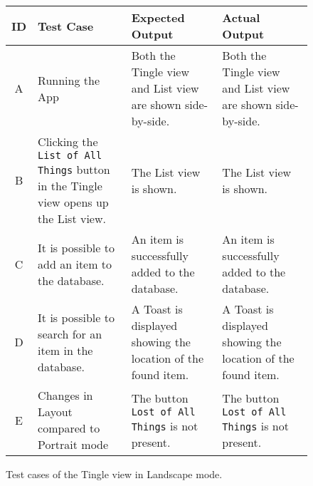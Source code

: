 \begin{figure}[H]
	\centering
	\renewcommand*{\arraystretch}{1.5} %
	\begin{tabular}{| c | p{3.5cm} | p{3.5cm} | p{3.5cm} |}
		\hline
		{\textbf{ID} } & {\textbf{Test Case} } & {\textbf{Expected Output}} & {\textbf {Actual Output}} \\\hline\hline
		A & Running the App & Both the Tingle view and List view are shown side-by-side. & Both the Tingle view and List view are shown side-by-side.  \\ \hline
		B &	Clicking the \texttt{List of All Things} button in the Tingle view opens up the List view. & The List view is shown. & The List view is shown. \\ \hline
		C & It is possible to add an item to the database. & An item is successfully added to the database. & An item is successfully added to the database. \\ \hline
		D & It is possible to search for an item in the database. & A Toast is displayed showing the location of the found item. & A Toast is displayed showing the location of the found item. \\ \hline
		E & Changes in Layout compared to Portrait mode & The button \texttt{Lost of All Things} is not present. & The button \texttt{Lost of All Things} is not present. \\ \hline
	\end{tabular}
	
	\caption{Test cases of the Tingle view in Landscape mode.}
	\label{tab:test-cases-tingle-landscape}
\end{figure}

